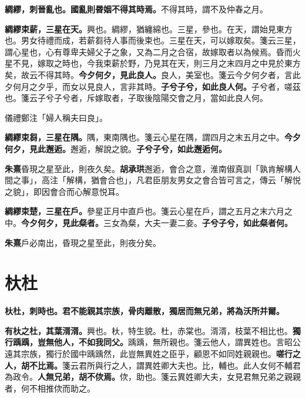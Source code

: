 
\textbf{綢繆，刺晉亂也。國亂則昬姻不得其時焉。}{\footnotesize 不得其時，謂不及仲春之月。}

\textbf{綢繆束薪，三星在天。}{\footnotesize 興也。綢繆，猶纏綿也。三星，參也。在天，謂始見東方也。男女待禮而成，若薪芻待人事而後束也。三星在天，可以嫁取矣。箋云三星，謂心星也，心有尊卑夫婦父子之象，又為二月之合宿，故嫁取者以為候焉。昏而火星不見，嫁取之時也，今我束薪於野，乃見其在天，則三月之末四月之中見於東方矣，故云不得其時。}\textbf{今夕何夕，見此良人。}{\footnotesize 良人，美室也。箋云今夕何夕者，言此夕何月之夕乎，而女以見良人，言非其時。}\textbf{子兮子兮，如此良人何。}{\footnotesize 子兮者，嗟茲也。箋云子兮子兮者，斥嫁取者，子取後陰陽交會之月，當如此良人何。}

\begin{quoting}儀禮鄭注「婦人稱夫曰良」。\end{quoting}

\textbf{綢繆束芻，三星在隅。}{\footnotesize 隅，東南隅也。箋云心星在隅，謂四月之末五月之中。}\textbf{今夕何夕，見此邂逅。}{\footnotesize 邂逅，解說之貌。}\textbf{子兮子兮，如此邂逅何。}

\begin{quoting}\textbf{朱熹}昏現之星至此，則夜久矣。\textbf{胡承珙}邂逅，會合之意，淮南俶真訓「孰肯解構人間之事」，高注「解構，猶會合也」，凡君臣朋友男女之會合皆可言之，傳云「解悦之貌」，即因會合而心解意悦耳。\end{quoting}

\textbf{綢繆束楚，三星在戶。}{\footnotesize 參星正月中直戶也。箋云心星在戶，謂之五月之末六月之中。}\textbf{今夕何夕，見此粲者。}{\footnotesize 三女為粲，大夫一妻二妾。}\textbf{子兮子兮，如此粲者何。}

\begin{quoting}\textbf{朱熹}戶必南出，昏現之星至此，則夜分矣。\end{quoting}

\section{杕杜}


\textbf{杕杜，刺時也。君不能親其宗族，骨肉離散，獨居而無兄弟，將為沃所并爾。}

\textbf{有杕之杜，其葉湑湑。}{\footnotesize 興也。杕，特生貌。杜，赤棠也。湑湑，枝葉不相比也。}\textbf{獨行踽踽，豈無他人，不如我同父。}{\footnotesize 踽踽，無所親也。箋云他人，謂異姓也。言昭公遠其宗族，獨行於國中踽踽然，此豈無異姓之臣乎，顧恩不如同姓親親也。}\textbf{嗟行之人，胡不比焉。}{\footnotesize 箋云君所與行之人，謂異姓卿大夫也。比，輔也。此人女何不輔君為政令。}\textbf{人無兄弟，胡不佽焉。}{\footnotesize 佽，助也。箋云異姓卿大夫，女見君無兄弟之親親者，何不相推佽而助之。}

